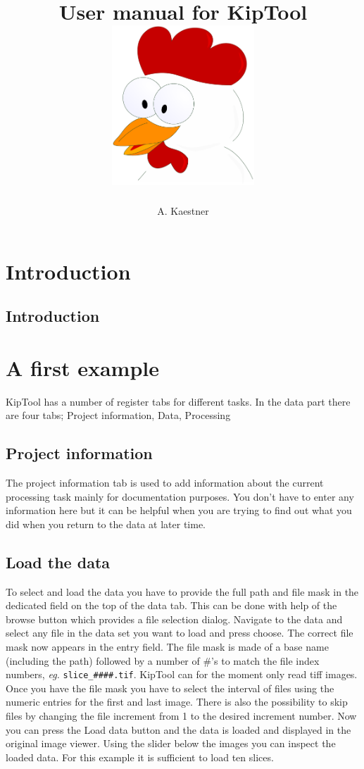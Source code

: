 \documentclass[a4paper]{scrreprt}
\title{User manual for KipTool\\\vskip30pt\includegraphics[width=0.4\textwidth]{figures/kip_icon.pdf}}
\author{A. Kaestner}
\begin{document}
\maketitle
\tableofcontents
\chapter{Introduction}
\section{Introduction}

\chapter{A first example}
KipTool has a number of register tabs for different tasks. In the data part there are four tabs; Project information, Data, Processing
\section{Project information}
The project information tab is used to add information about the current processing task mainly for documentation purposes. You don't have to enter any information here but it can be helpful when you are trying to find out what you did when you return to the data at later time.

\section{Load the data}
To select and load the data you have to provide the full path and file mask in the dedicated field on the top of the data tab. This can be done with help of the browse button which provides a file selection dialog. Navigate to the data and select any file in the data set you want to load and press choose. The correct file mask now appears in the entry field. The file mask is made of a base name (including the path) followed by a number of \#'s to match the file index numbers, \emph{eg.} \verb+slice_####.tif+. KipTool can for the moment only read tiff images. Once you have the file mask you have to select the interval of files using the numeric entries for the first and last image. There is also the possibility to skip files by changing the file increment from 1 to the desired increment number. Now you can press the Load data button and the data is loaded and displayed in the original image viewer. Using the slider below the images you can inspect the loaded data. For this example it is sufficient to load ten slices. 
\end{document}
